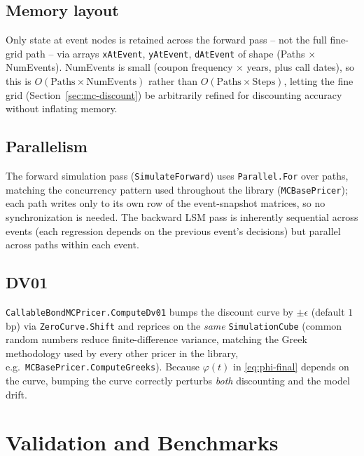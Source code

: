 \documentclass[11pt,a4paper]{article}
\newcommand{\coderef}[1]{\texttt{\color{blue!60!black}#1}}
\theoremstyle{definition}
\begin{document}
\subsection{Memory layout}

Only state at event nodes is retained across the forward pass -- not the
full fine-grid path -- via arrays \texttt{xAtEvent}, \texttt{yAtEvent},
\texttt{dAtEvent} of shape (Paths $\times$ NumEvents). NumEvents is small
(coupon frequency $\times$ years, plus call dates), so this is
$O(\text{Paths}\times\text{NumEvents})$ rather than
$O(\text{Paths}\times\text{Steps})$, letting the fine grid
(Section~\ref{sec:mc-discount}) be arbitrarily refined for discounting
accuracy without inflating memory.

\subsection{Parallelism}

The forward simulation pass (\coderef{SimulateForward}) uses
\lstinline{Parallel.For} over paths, matching the concurrency pattern used
throughout the library (\coderef{MCBasePricer}); each path writes only to
its own row of the event-snapshot matrices, so no synchronization is
needed. The backward LSM pass is inherently sequential across events (each
regression depends on the previous event's decisions) but parallel across
paths within each event.

\subsection{DV01}

\coderef{CallableBondMCPricer.ComputeDv01} bumps the discount curve by
$\pm\epsilon$ (default $1$bp) via \coderef{ZeroCurve.Shift} and reprices on
the \emph{same} \coderef{SimulationCube} (common random numbers reduce
finite-difference variance, matching the Greek methodology used by every
other pricer in the library, e.g.\ \coderef{MCBasePricer.ComputeGreeks}).
Because $\varphi(t)$ in \eqref{eq:phi-final} depends on the curve, bumping
the curve correctly perturbs \emph{both} discounting and the model drift.

\section{Validation and Benchmarks}
\label{sec:validation}
\end{document}
